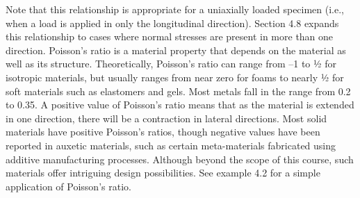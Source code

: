 \documentclass[
  letterpaper,
  DIV=11,
  numbers=noendperiod]{scrreprt}
\begin{document}
Note that this relationship is appropriate for a uniaxially loaded
specimen (i.e., when a load is applied in only the longitudinal
direction). Section 4.8 expands this relationship to cases where normal
stresses are present in more than one direction. Poisson's ratio is a
material property that depends on the material as well as its structure.
Theoretically, Poisson's ratio can range from --1 to ½ for isotropic
materials, but usually ranges from near zero for foams to nearly ½ for
soft materials such as elastomers and gels. Most metals fall in the
range from 0.2 to 0.35. A positive value of Poisson's ratio means that
as the material is extended in one direction, there will be a
contraction in lateral directions. Most solid materials have positive
Poisson's ratios, though negative values have been reported in auxetic
materials, such as certain meta-materials fabricated using additive
manufacturing processes. Although beyond the scope of this course, such
materials offer intriguing design possibilities. See example 4.2 for a
simple application of Poisson's ratio.
\end{document}
